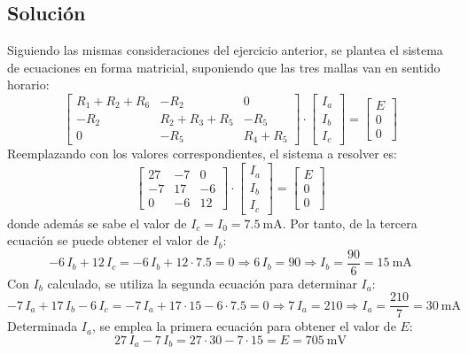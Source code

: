 \subsection*{Solución}
Siguiendo las mismas consideraciones del ejercicio anterior, se plantea el sistema de ecuaciones en forma matricial, suponiendo que
las tres mallas van en sentido horario:
\begin{equation*}
  \begin{bmatrix}
    R_1+R_2+R_6 & -R_2 & 0 \\
    -R_2 & R_2+R_3+R_5 & -R_5 \\
    0 & -R_5 & R_4+R_5
  \end{bmatrix} \cdot
  \begin{bmatrix}
    I_a\\
    I_b\\
    I_c
  \end{bmatrix} = %
  \begin{bmatrix}
    E \\
    0\\
    0
  \end{bmatrix}
\end{equation*}
Reemplazando con los valores correspondientes, el sistema a resolver es:
\begin{equation*}
  \begin{bmatrix}
    27 & -7 & 0 \\
    -7 & 17 & -6 \\
    0 & -6 & 12
  \end{bmatrix} \cdot
  \begin{bmatrix}
    I_a\\
    I_b\\
    I_c
  \end{bmatrix} = %
  \begin{bmatrix}
    E \\
    0\\
    0
  \end{bmatrix}
\end{equation*}
donde además se sabe el valor de $I_c=I_0=\qty{7.5}{\milli\ampere}$. Por
tanto, de la tercera ecuación se puede obtener el valor de $I_b$:
\begin{equation*}
  -6\,I_b+12\,I_c=-6\,I_b+12\cdot 7.5 = 0\Rightarrow 6\,I_b=90 \Rightarrow I_b=\dfrac{90}{6}=\qty{15}{\milli\ampere}
\end{equation*}
Con $I_b$ calculado, se utiliza la segunda ecuación para determinar
$I_a$:
\begin{equation*}
  -7\,I_a+17\,I_b-6\,I_c=-7\,I_a+17\cdot 15-6\cdot 7.5 = 0\Rightarrow 7\,I_a=210\Rightarrow I_a=\dfrac{210}{7}=\qty{30}{\milli\ampere}
\end{equation*}
Determinada $I_a$, se emplea la primera ecuación para obtener el valor
de $E$:
\begin{equation*}
  27\,I_a-7\,I_b=27\cdot 30 - 7 \cdot 15 = E = {\qty{705}{\milli\volt}}
\end{equation*}

